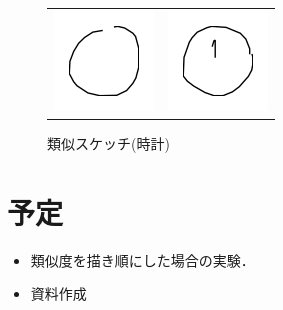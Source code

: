 \documentclass[onecolumn]{ujarticle}   %
\begin{document}
  \begin{figure}[htbp]
      \begin{tabular}{cc}
        \begin{minipage}[t]{0.45\hsize}
          \centering
          \includegraphics[keepaspectratio, scale=1]{sun_0_best.png}
          \caption{最尤部分スケッチ}
          \label{fig:result2_1}
        \end{minipage} &
        \begin{minipage}[t]{0.45\hsize}
          \centering
          \includegraphics[keepaspectratio, scale=1]{sun_clock_sim.png}
          \caption{類似スケッチ(時計)}
          \label{fig:result2_2}
        \end{minipage} \\

      \end{tabular}
    \end{figure}

\section{予定}
\begin{itemize}
  \item 類似度を描き順にした場合の実験．
  \item 資料作成
\end{itemize}



% 
% 
\end{document}

